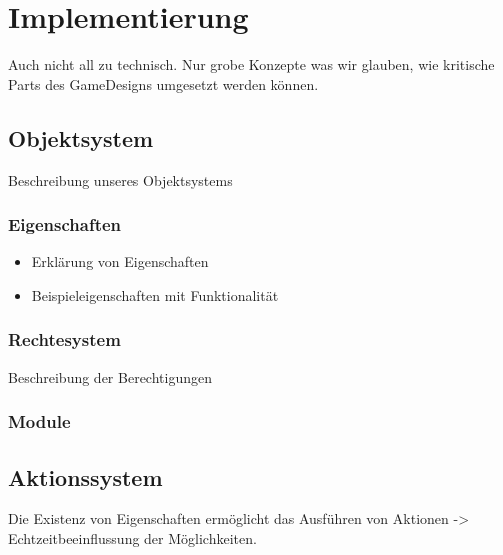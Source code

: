 \chapter{Implementierung}
\label{implementation}

Auch nicht all zu technisch. Nur grobe Konzepte was wir glauben, wie kritische Parts des GameDesigns umgesetzt werden können.

\section{Objektsystem}
\label{sec:Objektsystem}
Beschreibung unseres Objektsystems\newline


\subsection{Eigenschaften}
\label{sec:Eigenschaften}

\begin{itemize}
	\item Erklärung von Eigenschaften
	\item Beispieleigenschaften mit Funktionalität 
\end{itemize}

\subsection{Rechtesystem}
\label{sec:Rechtesystem}
Beschreibung der Berechtigungen

\subsection{Module}
\label{sec:Module}

\section{Aktionssystem}
\label{sec:Aktionssystem}
Die Existenz von Eigenschaften ermöglicht das Ausführen von Aktionen -> Echtzeitbeeinflussung der Möglichkeiten.
